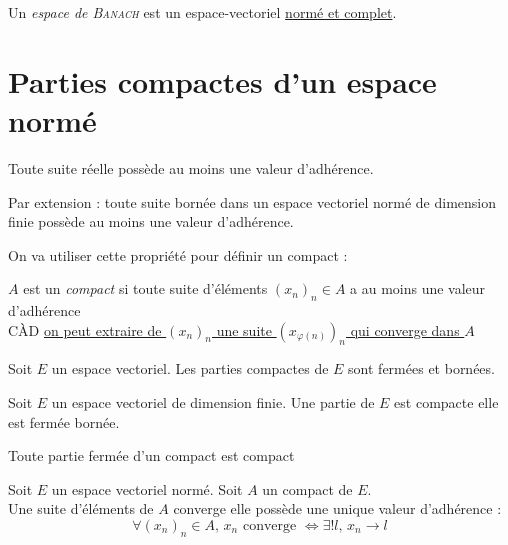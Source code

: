 \documentclass[11pt,a4paper,fleqn,pdftex]{report}
\begin{document}
\begin{dfn}
Un \emph{espace de \textsc{Banach}} est un espace-vectoriel \uline{normé et complet}.
\end{dfn}
\section{Parties compactes d'un espace normé} %
\label{sec:compacts}
\begin{itheorem}
     Toute suite réelle  possède au moins une valeur d'adhérence.\par
     Par extension : toute suite bornée dans un espace vectoriel normé de dimension finie possède au moins une valeur d'adhérence.
\end{itheorem}
On va utiliser cette propriété pour définir un compact :
\begin{dfn}[Compact]
$A$ est un \emph{compact} si toute suite d'éléments $(x_n)_n \in A$ a au moins une valeur d'adhérence\\
CÀD \uline{on peut extraire de $(x_n)_n$ une suite $\left( x_{\varphi(n)} \right)
_n$ qui converge dans $A$}
\end{dfn}
\begin{itheorem}
     Soit $E$ un espace vectoriel. Les parties compactes de $E$ sont fermées et bornées.
\end{itheorem}
\begin{theorem}
     Soit $E$ un espace vectoriel de dimension finie. \newline
     Une partie de $E$ est compacte \ssi elle est fermée bornée.
\end{theorem}
\begin{theorem}
     Toute partie fermée d'un compact est compact
\end{theorem}
\begin{theorem}
     Soit $E$ un espace vectoriel normé. Soit $A$ un compact de $E$.\\
     Une suite d'éléments de $A$ converge \ssi elle possède une unique valeur d'adhérence : 
     \begin{equation}
     \forall (x_n)_n \in A,\, x_n \text{ converge } \Leftrightarrow \exists ! l,\, x_n\to l
     \end{equation}
\end{theorem}
\end{document}

